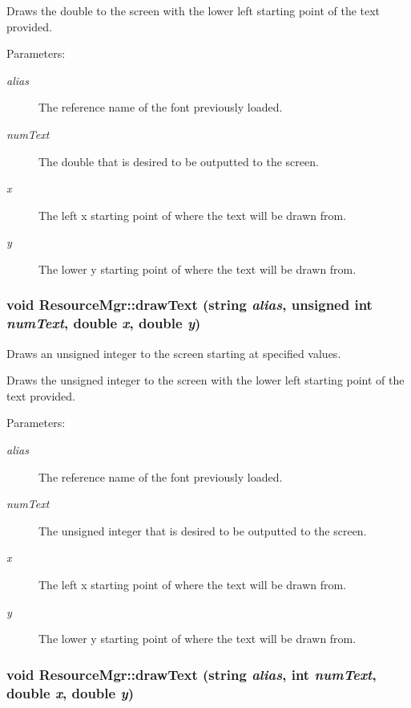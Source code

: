 Draws the double to the screen with the lower left starting point of the text provided. \begin{Desc}
\item[Parameters:]
\begin{description}
\item[{\em alias}]The reference name of the font previously loaded. \item[{\em numText}]The double that is desired to be outputted to the screen. \item[{\em x}]The left x starting point of where the text will be drawn from. \item[{\em y}]The lower y starting point of where the text will be drawn from. \end{description}
\end{Desc}
\hypertarget{class_resource_mgr_d326c9c69e0f7128ced33c5544b31708}{
\subsubsection[{drawText}]{\setlength{\rightskip}{0pt plus 5cm}void ResourceMgr::drawText (string {\em alias}, \/  unsigned int {\em numText}, \/  double {\em x}, \/  double {\em y})}}
\label{class_resource_mgr_d326c9c69e0f7128ced33c5544b31708}


Draws an unsigned integer to the screen starting at specified values. 

Draws the unsigned integer to the screen with the lower left starting point of the text provided. \begin{Desc}
\item[Parameters:]
\begin{description}
\item[{\em alias}]The reference name of the font previously loaded. \item[{\em numText}]The unsigned integer that is desired to be outputted to the screen. \item[{\em x}]The left x starting point of where the text will be drawn from. \item[{\em y}]The lower y starting point of where the text will be drawn from. \end{description}
\end{Desc}
\hypertarget{class_resource_mgr_410b4d2bae7cd991d1f7095a7458ec30}{
\subsubsection[{drawText}]{\setlength{\rightskip}{0pt plus 5cm}void ResourceMgr::drawText (string {\em alias}, \/  int {\em numText}, \/  double {\em x}, \/  double {\em y})}}
\label{class_resource_mgr_410b4d2bae7cd991d1f7095a7458ec30}



